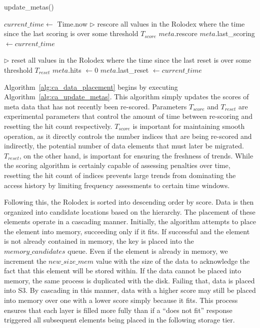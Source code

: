 \begin{algorithm}[htp]
	\small
	\caption{\label{alg:ca_update_metas}update\_metas()}
	\begin{algorithmic}[1]
	\STATE $current\_time \leftarrow$ Time.now
	\STATE $\triangleright$ rescore all values in the Rolodex where the time
	since the last scoring is over some threshold $T_{score}$
			\STATE $meta$.rescore
			\STATE $meta$.last\_scoring $\leftarrow current\_time$
		\ENDIF
	\ENDFOR
	
	\STATE $\triangleright$ reset all values in the Rolodex where the time
	since the last reset is over some threshold $T_{reset}$
			\STATE $meta$.hits $\leftarrow 0$
			\STATE $meta$.last\_reset $\leftarrow current\_time$
		\ENDIF
	\ENDFOR
\end{algorithmic}
\end{algorithm}

Algorithm~\ref{alg:ca_data_placement} begins by executing
Algorithm~\ref{alg:ca_update_metas}. This algorithm simply updates the scores
of meta data that has not recently been re-scored. Parameters $T_{score}$ and
$T_{reset}$ are experimental parameters that control the amount of time between
re-scoring and resetting the hit count respectively. $T_{score}$ is important for
maintaining smooth operation, as it directly controls the number indices
that are being re-scored and indirectly, the potential number of data elements
that must later be migrated. $T_{reset}$, on the other hand, is important for
ensuring the freshness of trends. While the scoring algorithm is certainly
capable of assessing penalties over time, resetting the hit count of indices
prevents large trends from dominating the access history by limiting frequency
assessments to certain time windows.

Following this, the Rolodex is sorted into descending order by score. Data is
then organized into candidate locations based on the hierarchy. The placement
of these elements operate in a cascading manner. Initially, the algorithm
attempts to place the element into memory, succeeding only if it fits. If
successful and the element is not already contained in memory, the key is
placed into the $memory\_candidates$ queue. Even if the element is already in
memory, we increment the $new\_size\_mem$ value with the size of the data to
acknowledge the fact that this element will be stored within. If the data
cannot be placed into memory, the same process is duplicated with the disk.
Failing that, data is placed into S3. By cascading in this manner, data
with a higher score may still be placed into memory over one with a lower score
simply because it fits. This process ensures that each layer is filled more
fully than if a ``does not fit'' response triggered all subsequent elements
being placed in the following storage tier.

